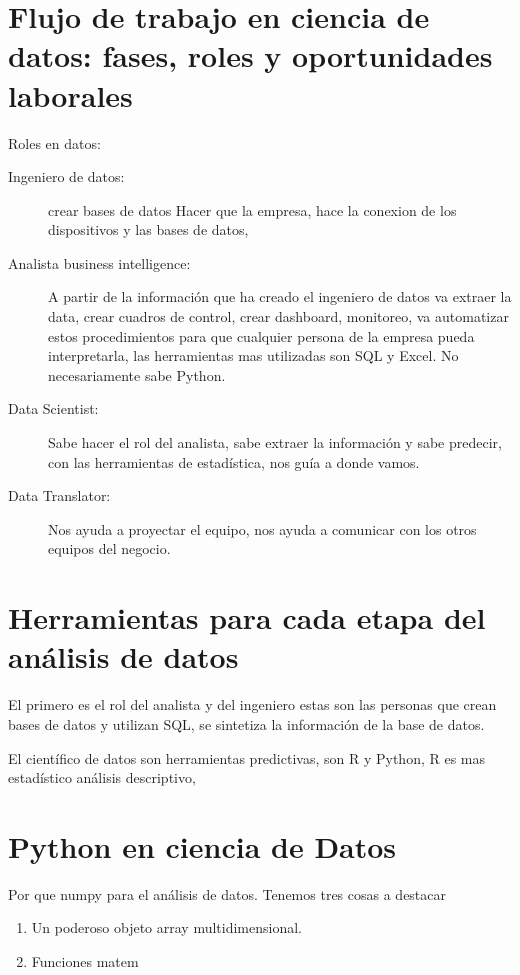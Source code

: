 \section{Flujo de trabajo en ciencia de datos: fases, roles y oportunidades laborales}

Roles en datos:

\begin{description}
	\item[Ingeniero de datos: ] crear bases de datos  Hacer que la empresa, hace la conexion de los dispositivos y las bases de datos,

	\item[Analista business intelligence: ] A partir de la informaci\'on que ha creado el ingeniero de datos va extraer la data, crear cuadros de control, crear dashboard, monitoreo, va automatizar estos procedimientos para que cualquier persona de la empresa pueda interpretarla, las herramientas mas utilizadas son SQL y Excel. No necesariamente sabe Python.

	\item[Data Scientist: ] Sabe hacer el rol del analista, sabe extraer la informaci\'on y sabe predecir, con las herramientas de estad\'istica, nos gu\'ia a donde vamos.

	\item[Data Translator: ] Nos ayuda a proyectar el equipo, nos ayuda a comunicar con los otros equipos del negocio.


\end{description}

\section{Herramientas para cada etapa del an\'alisis de datos}

El primero es el rol del analista y del ingeniero estas son las personas que crean bases de datos y utilizan SQL, se sintetiza la informaci\'on de la base de datos.

El cient\'ifico de datos son herramientas predictivas, son R y Python, R es mas estad\'istico an\'alisis descriptivo,

\section{Python en ciencia de Datos}

Por que numpy para el análisis de datos. Tenemos tres cosas a destacar
\begin{enumerate}
	\item Un poderoso objeto array multidimensional.
	\item Funciones matem
\end{enumerate}

